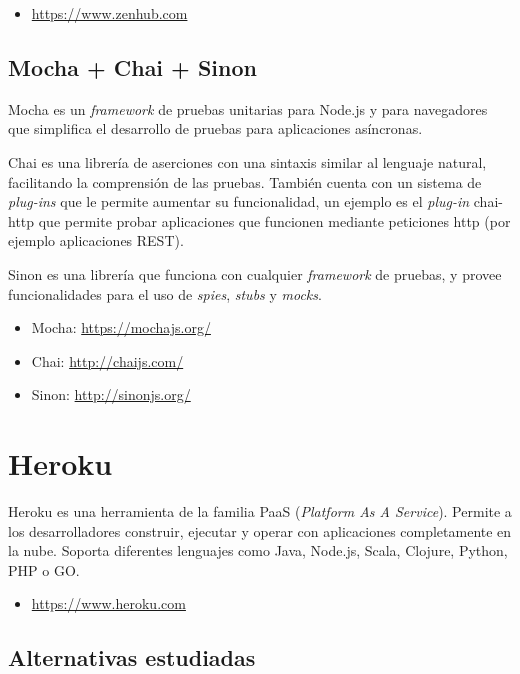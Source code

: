 \begin{itemize}
	\item \url{https://www.zenhub.com}
\end{itemize}

\subsection{Mocha + Chai + Sinon}

Mocha es un \emph{framework} de pruebas unitarias para Node.js y para navegadores que simplifica el desarrollo de pruebas para aplicaciones asíncronas.

Chai es una librería de aserciones con una sintaxis similar al lenguaje natural, facilitando la comprensión de las pruebas. También cuenta con un sistema de \emph{plug-ins} que le permite aumentar su funcionalidad, un ejemplo es el \emph{plug-in} chai-http que permite probar aplicaciones que funcionen mediante peticiones http (por ejemplo aplicaciones REST).

Sinon es una librería que funciona con cualquier \emph{framework} de pruebas, y provee funcionalidades para el uso de \emph{spies}, \emph{stubs} y \emph{mocks}. 

\begin{itemize}
	\item Mocha: \url{https://mochajs.org/}
	\item Chai: \url{http://chaijs.com/}
	\item Sinon: \url{http://sinonjs.org/}
\end{itemize}

\section{Heroku}

Heroku es una herramienta de la familia PaaS (\emph{Platform As A Service}). Permite a los desarrolladores construir, ejecutar y operar con aplicaciones completamente en la nube. Soporta diferentes lenguajes como Java, Node.js, Scala, Clojure, Python, PHP o GO.

\begin{itemize}
	\item \url{https://www.heroku.com}
\end{itemize}

\subsection{Alternativas estudiadas}

